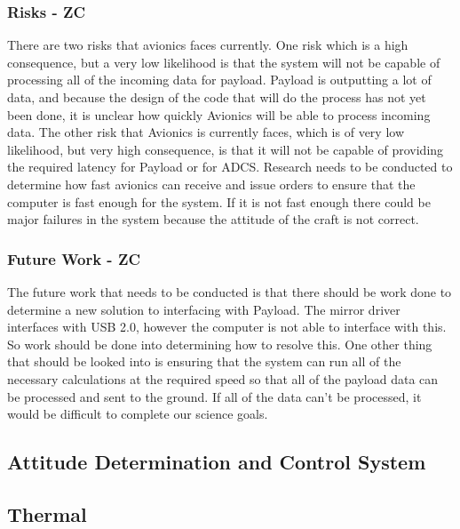 \documentclass[12pt]{article}
\begin{document}
			\subsubsection{Risks - ZC}
There are two risks that avionics faces currently. One risk which is a high consequence, but a very low likelihood is that the system will not be capable of processing all of the incoming data for payload. Payload is outputting a lot of data, and because the design of the code that will do the process has not yet been done, it is unclear how quickly Avionics will be able to process incoming data. The other risk that Avionics is currently faces, which is of very low likelihood, but very high consequence, is that it will not be capable of providing the required latency for Payload or for ADCS. Research needs to be conducted to determine how fast avionics can receive and issue orders to ensure that the computer is fast enough for the system. If it is not fast enough there could be major failures in the system because the attitude of the craft is not correct.

			\subsubsection{Future Work - ZC}
The future work that needs to be conducted is that there should be work done to determine a new solution to interfacing with Payload. The mirror driver interfaces with USB 2.0, however the computer is not able to interface with this. So work should be done into determining how to resolve this. One other thing that should be looked into is ensuring that the system can run all of the necessary calculations at the required speed so that all of the payload data can be processed and sent to the ground. If all of the data can’t be processed, it would be difficult to complete our science goals.


		\subsection{Attitude Determination and Control System}


		\subsection{Thermal}
\end{document}
